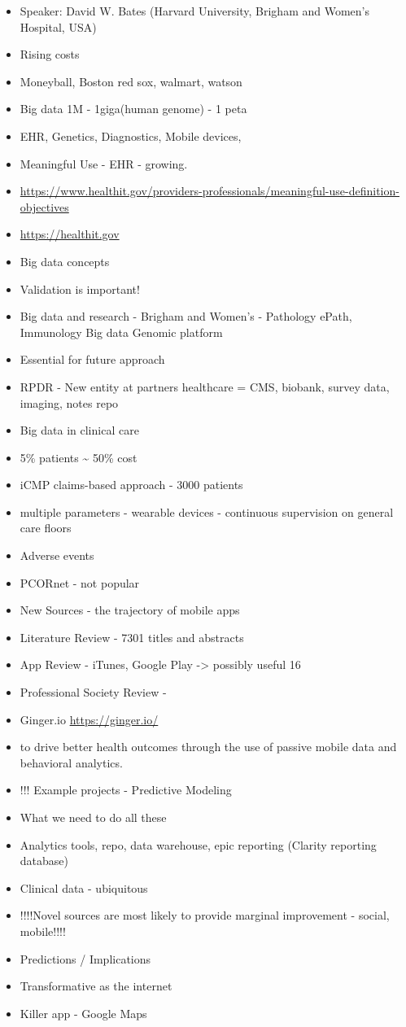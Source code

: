 \documentclass[]{book}
\providecommand{\tightlist}{%
  \setlength{\itemsep}{0pt}\setlength{\parskip}{0pt}}
\begin{document}
\begin{itemize}
\tightlist
\item
  Speaker: David W. Bates (Harvard University, Brigham and Women's
  Hospital, USA)
\item
  Rising costs
\item
  Moneyball, Boston red sox, walmart, watson
\item
  Big data 1M - 1giga(human genome) - 1 peta
\item
  EHR, Genetics, Diagnostics, Mobile devices,
\item
  Meaningful Use - EHR - growing.
\item
  \url{https://www.healthit.gov/providers-professionals/meaningful-use-definition-objectives}
\item
  \url{https://healthit.gov}
\item
  Big data concepts
\item
  Validation is important!
\item
  Big data and research - Brigham and Women's - Pathology ePath,
  Immunology Big data Genomic platform
\item
  Essential for future approach
\item
  RPDR - New entity at partners healthcare = CMS, biobank, survey data,
  imaging, notes repo
\item
  Big data in clinical care
\item
  5\% patients \textasciitilde{} 50\% cost
\item
  iCMP claims-based approach - 3000 patients
\item
  multiple parameters - wearable devices - continuous supervision on
  general care floors
\item
  Adverse events
\item
  PCORnet - not popular
\item
  New Sources - the trajectory of mobile apps
\item
  Literature Review - 7301 titles and abstracts
\item
  App Review - iTunes, Google Play -\textgreater{} possibly useful 16
\item
  Professional Society Review -
\item
  Ginger.io \url{https://ginger.io/}
\item
  to drive better health outcomes through the use of passive mobile data
  and behavioral analytics.
\item
  !!! Example projects - Predictive Modeling
\item
  What we need to do all these
\item
  Analytics tools, repo, data warehouse, epic reporting (Clarity
  reporting database)
\item
  Clinical data - ubiquitous
\item
  !!!!Novel sources are most likely to provide marginal improvement -
  social, mobile!!!!
\item
  Predictions / Implications
\item
  Transformative as the internet
\item
  Killer app - Google Maps
\end{itemize}
\end{document}
